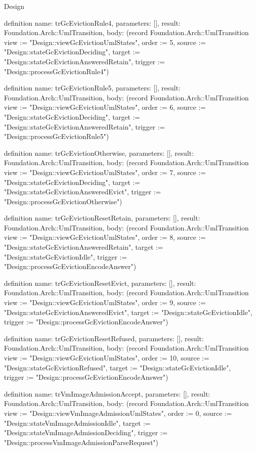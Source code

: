 \begin{lexlean}{Design}
\begin{semanticmodule}
definition{
  name: trGcEvictionRule4,
  parameters: [],
  result: Foundation.Arch::UmlTransition,
  body: (record Foundation.Arch::UmlTransition {view := "Design::viewGcEvictionUmlStates", order := 5, source := "Design::stateGcEvictionDeciding", target := "Design::stateGcEvictionAnsweredRetain", trigger := "Design::processGcEvictionRule4"})
}

definition{
  name: trGcEvictionRule5,
  parameters: [],
  result: Foundation.Arch::UmlTransition,
  body: (record Foundation.Arch::UmlTransition {view := "Design::viewGcEvictionUmlStates", order := 6, source := "Design::stateGcEvictionDeciding", target := "Design::stateGcEvictionAnsweredRetain", trigger := "Design::processGcEvictionRule5"})
}

definition{
  name: trGcEvictionOtherwise,
  parameters: [],
  result: Foundation.Arch::UmlTransition,
  body: (record Foundation.Arch::UmlTransition {view := "Design::viewGcEvictionUmlStates", order := 7, source := "Design::stateGcEvictionDeciding", target := "Design::stateGcEvictionAnsweredEvict", trigger := "Design::processGcEvictionOtherwise"})
}

definition{
  name: trGcEvictionResetRetain,
  parameters: [],
  result: Foundation.Arch::UmlTransition,
  body: (record Foundation.Arch::UmlTransition {view := "Design::viewGcEvictionUmlStates", order := 8, source := "Design::stateGcEvictionAnsweredRetain", target := "Design::stateGcEvictionIdle", trigger := "Design::processGcEvictionEncodeAnswer"})
}

definition{
  name: trGcEvictionResetEvict,
  parameters: [],
  result: Foundation.Arch::UmlTransition,
  body: (record Foundation.Arch::UmlTransition {view := "Design::viewGcEvictionUmlStates", order := 9, source := "Design::stateGcEvictionAnsweredEvict", target := "Design::stateGcEvictionIdle", trigger := "Design::processGcEvictionEncodeAnswer"})
}

definition{
  name: trGcEvictionResetRefused,
  parameters: [],
  result: Foundation.Arch::UmlTransition,
  body: (record Foundation.Arch::UmlTransition {view := "Design::viewGcEvictionUmlStates", order := 10, source := "Design::stateGcEvictionRefused", target := "Design::stateGcEvictionIdle", trigger := "Design::processGcEvictionEncodeAnswer"})
}

definition{
  name: trVmImageAdmissionAccept,
  parameters: [],
  result: Foundation.Arch::UmlTransition,
  body: (record Foundation.Arch::UmlTransition {view := "Design::viewVmImageAdmissionUmlStates", order := 0, source := "Design::stateVmImageAdmissionIdle", target := "Design::stateVmImageAdmissionDeciding", trigger := "Design::processVmImageAdmissionParseRequest"})
}


\end{semanticmodule}
\end{lexlean}
